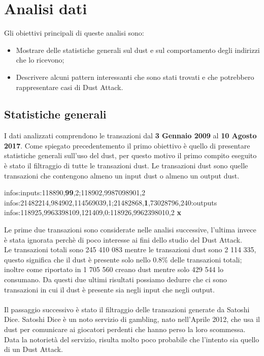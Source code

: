 \chapter{Analisi dati}
Gli obiettivi principali di queste analisi sono:
\begin{itemize}
    \item Mostrare delle statistiche generali sul dust e sul comportamento degli indirizzi che lo ricevono;
    \item Descrivere alcuni pattern interessanti che sono stati trovati e che potrebbero rappresentare casi di Dust Attack.
\end{itemize}
\section{Statistiche generali}
I dati analizzati comprendono le transazioni dal \textbf{3 Gennaio 2009} al \textbf{10 Agosto 2017}.
Come spiegato precedentemento il primo obiettivo è quello di presentare statistiche generali sull'uso del dust, per questo motivo il primo compito eseguito è stato il filtraggio di tutte le transazioni dust. Le transazioni dust sono quelle transazioni che contengono almeno un input dust o almeno un output dust.
\begin{mdframed}
 infos:inputs:118890,\textbf{99},2;118902,9987098901,2 \checkmark\\
 infos:21482214,984902,114569039,1;21482868,\textbf{1},73028796,240:outputs \checkmark\\
 infos:118925,9963398109,121409,0:118926,9962398010,2 \textbf{x}
\end{mdframed}
Le prime due transazioni sono considerate nelle analisi successive, l'ultima invece è stata ignorata perchè di poco interesse ai fini dello studio del Dust Attack.\\
Le transazioni totali sono 245 410 083 mentre le transazioni dust sono 2 114 335, questo significa che il dust è presente solo nello 0.8\% delle transazioni totali; inoltre come riportato in\cite{dustAnalisi} 1 705 560 creano dust mentre solo 429 544 lo consumano. Da questi due ultimi risultati possiamo dedurre che ci sono transazioni in cui il dust è presente sia negli input che negli output.\\\\
Il passaggio successivo è stato il filtraggio delle transazioni generate da Satoshi Dice. Satoshi Dice\cite{SD} è un noto servizio di gambling, nato nell'Aprile 2012, che usa il dust per comunicare ai giocatori perdenti che hanno perso la loro scommessa. Data la notorietà del servizio, risulta molto poco probabile che l'intento sia quello di un Dust Attack.\\
